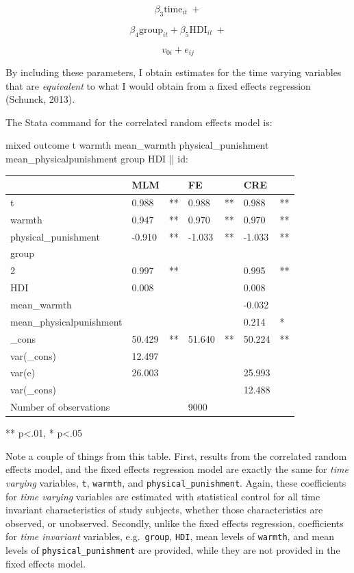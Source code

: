 \documentclass[
  letterpaper,
  DIV=11,
  numbers=noendperiod]{scrreprt}
\newenvironment{Shaded}{\begin{snugshade}}{\end{snugshade}}
\newcommand{\FunctionTok}[1]{\textcolor[rgb]{0.28,0.35,0.67}{#1}}
\newcommand{\NormalTok}[1]{\textcolor[rgb]{0.00,0.23,0.31}{#1}}
\begin{document}
\[\beta_3 \text{time}_{it} \ + \]

\[\beta_4 \text{group}_{it} + \beta_5 \text{HDI}_{it} \ +\]

\[v_{0i} + e_{ij}\]

By including these parameters, I obtain estimates for the time varying
variables that are \emph{equivalent} to what I would obtain from a fixed
effects regression (Schunck, 2013).

The Stata command for the correlated random effects model is:

\begin{Shaded}
\begin{Highlighting}[]

\NormalTok{mixed outcome t warmth mean\_warmth physical\_punishment mean\_physicalpunishment }\FunctionTok{group}\NormalTok{ HDI || id:}
  
\end{Highlighting}
\end{Shaded}

\begin{longtable}[]{@{}lllllll@{}}
\toprule\noalign{}
& MLM & & FE & & CRE & \\
\midrule\noalign{}
\endhead
\bottomrule\noalign{}
\endlastfoot
t & 0.988 & ** & 0.988 & ** & 0.988 & ** \\
warmth & 0.947 & ** & 0.970 & ** & 0.970 & ** \\
physical\_punishment & -0.910 & ** & -1.033 & ** & -1.033 & ** \\
group & & & & & & \\
2 & 0.997 & ** & & & 0.995 & ** \\
HDI & 0.008 & & & & 0.008 & \\
mean\_warmth & & & & & -0.032 & \\
mean\_physicalpunishment & & & & & 0.214 & * \\
\_cons & 50.429 & ** & 51.640 & ** & 50.224 & ** \\
var(\_cons) & 12.497 & & & & & \\
var(e) & 26.003 & & & & 25.993 & \\
var(\_cons) & & & & & 12.488 & \\
Number of observations & & & 9000 & & & \\
\end{longtable}

** p\textless.01, * p\textless.05

Note a couple of things from this table. First, results from the
correlated random effects model, and the fixed effects regression model
are exactly the same for \emph{time varying} variables, \texttt{t},
\texttt{warmth}, and \texttt{physical\_punishment}. Again, these
coefficients for \emph{time varying} variables are estimated with
statistical control for all time invariant characteristics of study
subjects, whether those characteristics are observed, or unobserved.
Secondly, unlike the fixed effects regression, coefficients for
\emph{time invariant} variables, e.g.~\texttt{group}, \texttt{HDI}, mean
levels of \texttt{warmth}, and mean levels of
\texttt{physical\_punishment} are provided, while they are not provided
in the fixed effects model.
\end{document}
